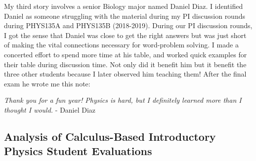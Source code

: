 \documentclass[../../main.tex]{subfiles}
\begin{document}
My third story involves a senior Biology major named Daniel Diaz.  I identified Daniel as someone struggling with the material during my PI discussion rounds during PHYS135A and PHYS135B (2018-2019).  During our PI discussion rounds, I got the sense that Daniel was close to get the right answers but was just short of making the vital connections necessary for word-problem solving.  I made a concerted effort to spend more time at his table, and worked quick examples for their table during discussion time.  Not only did it benefit him but it benefit the three other students because I later observed him teaching them!  After the final exam he wrote me this note: \\ \hspace{0.1cm}

\textit{Thank you for a fun year!  Physics is hard, but I definitely learned more than I thought I would.} - Daniel Diaz \\ \hspace{0.1cm}

\subsection{Analysis of Calculus-Based Introductory Physics Student Evaluations}
\end{document}
